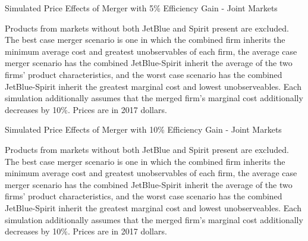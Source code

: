 \documentclass{article}
\begin{document}
\begin{appendices}
        \begin{table}
        \caption{Simulated Price Effects of Merger with 5\% Efficiency Gain - Joint Markets}
        \label{tab:Simulation_Price_5}
                \vspace{-15mm}
        \begin{center}
         
        \end{center}
        \vspace{-5mm}
        \footnotesize{Products from markets without both JetBlue and Spirit present are excluded. The best case merger scenario is one in which the combined firm inherits the minimum average cost and greatest unobservables of each firm, the average case merger scenario has the combined JetBlue-Spirit inherit the average of the two firms' product characteristics, and the worst case scenario has the combined JetBlue-Spirit inherit the greatest marginal cost and lowest unobserveables. Each simulation additionally assumes that the merged firm's marginal cost additionally decreases by 10\%. Prices are in 2017 dollars.}

     \end{table}

     
        \begin{table}
        \caption{Simulated Price Effects of Merger with 10\% Efficiency Gain - Joint Markets}
        \label{tab:Simulation_Price_10}
                \vspace{-15mm}
        \begin{center}
         
        \end{center}
        \vspace{-5mm}
        \footnotesize{Products from markets without both JetBlue and Spirit present are excluded. The best case merger scenario is one in which the combined firm inherits the minimum average cost and greatest unobservables of each firm, the average case merger scenario has the combined JetBlue-Spirit inherit the average of the two firms' product characteristics, and the worst case scenario has the combined JetBlue-Spirit inherit the greatest marginal cost and lowest unobserveables. Each simulation additionally assumes that the merged firm's marginal cost additionally decreases by 10\%. Prices are in 2017 dollars.}

     \end{table}


\end{appendices}
\end{document}
